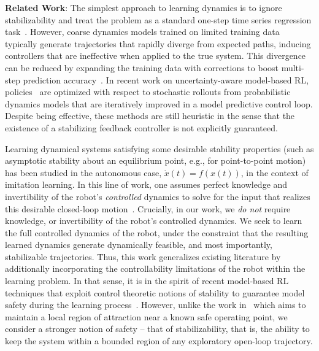 \documentclass[conference]{svproc}
\begin{document}
{\bf Related Work}:  The simplest approach to learning dynamics is to ignore stabilizability and treat the problem as a standard one-step time series regression task~\cite{NagabandiKahnEtAl2017,ChuaCalandraEtAl2018,DeisenrothRasmussen2011}. However, coarse dynamics models trained on limited training data typically generate trajectories that rapidly diverge from expected paths, inducing controllers that are ineffective when applied to the true system. This divergence can be reduced by expanding the training data with corrections to boost multi-step prediction accuracy~\cite{VenkatramanHebertEtAl2015, VenkatramanCapobiancoEtAl2016}. In recent work on uncertainty-aware model-based RL, policies~\cite{NagabandiKahnEtAl2017,ChuaCalandraEtAl2018} are optimized with respect to stochastic rollouts from probabilistic dynamics models that are iteratively improved in a model predictive control loop. Despite being effective, these methods are still heuristic in the sense that the existence of a stabilizing feedback controller is not explicitly guaranteed. 

Learning dynamical systems satisfying some desirable stability properties (such as asymptotic stability about an equilibrium point, e.g., for point-to-point motion) has been studied in the autonomous case, $\dot{x}(t) = f(x(t))$, in the context of imitation learning. In this line of work, one assumes perfect knowledge and invertibility of the robot's \emph{controlled} dynamics to solve for the input that realizes this desirable closed-loop motion~\cite{LemmeNeumannEtAl2014,Khansari-ZadehKhatib2017,SindhwaniTuEtAl2018,RavichandarSalehiEtAl2017,Khansari-ZadehBillard2011,MedinaBillard2017}. Crucially, in our work, we \emph{do not} require knowledge, or invertibility of the robot's controlled dynamics. We seek to learn the full controlled dynamics of the robot, under the constraint that the resulting learned dynamics generate dynamically feasible, and most importantly, stabilizable trajectories. Thus, this work generalizes existing literature by additionally incorporating the controllability limitations of the robot within the learning problem. In that sense, it is in the spirit of recent model-based RL techniques that exploit control theoretic notions of stability to guarantee model safety during the learning process~\cite{BerkenkampTurchettaEtAl2017}. However, unlike the work in~\cite{BerkenkampTurchettaEtAl2017} which aims to maintain a local region of attraction near a known safe operating point, we consider a stronger notion of safety -- that of stabilizability, that is, the ability to keep the system within a bounded region of any exploratory open-loop trajectory. 
\end{document}
